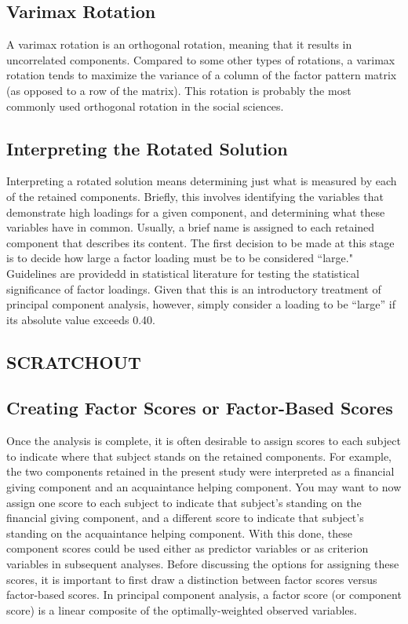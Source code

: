 \subsection{Varimax Rotation}
A varimax rotation is an orthogonal rotation, meaning that
it results in uncorrelated components. Compared to some other types of rotations, a varimax
rotation tends to maximize the variance of a column of the factor pattern matrix (as opposed to a
row of the matrix). This rotation is probably the most commonly used orthogonal rotation in the
social sciences.

\subsection{Interpreting the Rotated Solution}

Interpreting a rotated solution means determining just what is measured by each of the retained
components. Briefly, this involves identifying the variables that demonstrate high loadings for a
given component, and determining what these variables have in common. Usually, a brief name
is assigned to each retained component that describes its content.
The first decision to be made at this stage is to decide how large a factor loading must be to be
considered ``large." 
Guidelines are providedd in statistical literature for testing the statistical significance of factor loadings. Given that this
is an introductory treatment of principal component analysis, however, simply consider a loading
to be “large” if its absolute value exceeds 0.40.

\subsection{SCRATCHOUT} 


\subsection{Creating Factor Scores or Factor-Based Scores}

Once the analysis is complete, it is often desirable to assign scores to each subject to indicate
where that subject stands on the retained components. For example, the two components
retained in the present study were interpreted as a financial giving component and an
acquaintance helping component. You may want to now assign one score to each subject to
indicate that subject’s standing on the financial giving component, and a different score to
indicate that subject’s standing on the acquaintance helping component. With this done, these
component scores could be used either as predictor variables or as criterion variables in
subsequent analyses.
Before discussing the options for assigning these scores, it is important to first draw a distinction
between factor scores versus factor-based scores. In principal component analysis, a factor
score (or component score) is a linear composite of the optimally-weighted observed variables.

